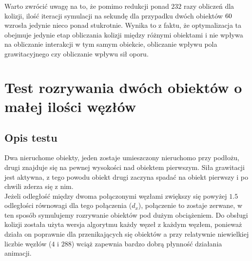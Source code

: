 \documentclass[12pt, letterpaper]{report}
\begin{document}
    Warto zwrócić uwagę na to, że pomimo redukcji ponad $232$ razy obliczeń dla kolizji, 
    ilość iteracji symulacji na sekundę dla przypadku dwóch obiektów $60 \time 60$ wzrosła jedynie
    nieco ponad stukrotnie. Wynika to z faktu, że optymalizacja ta obejmuje jedynie etap obliczania
    kolizji między różnymi obiektami i nie wpływa na obliczanie interakcji w tym samym obiekcie,
    obliczanie wpływu pola grawitacyjnego czy obliczanie wpływu sił oporu.

    \section{Test rozrywania dwóch obiektów o małej ilości węzłów}
    \subsection{Opis testu}
    Dwa nieruchome obiekty, jeden zostaje umieszczony nieruchomo przy podłożu, 
    drugi znajduje się na pewnej wysokości nad obiektem pierwszym. Siła grawitacji
    jest aktywna, z tego powodu obiekt drugi zaczyna spadać na obiekt pierwszy i po chwili zderza się z nim. \\ 

    Jeżeli odległość między dwoma połączonymi węzłami zwiększy się powyżej $1.5$ odległości równowagi dla 
    tego połączenia ($d_x$), połączenie to zostaje zerwane, w ten sposób symulujemy rozrywanie obiektów pod dużym 
    obciążeniem. Do obsługi kolizji została użyta wersja algorytmu każdy węzeł z każdym węzłem, ponieważ
    działa on poprawnie dla przenikających się obiektów a przy relatywnie niewielkiej liczbie 
    węzłów ($4$ i $288$) wciąż zapewnia bardzo dobrą płynność działania animacji.
\end{document}
